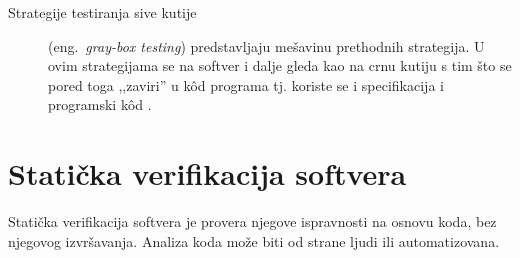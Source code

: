 \documentclass[12pt,oneside]{memoir}
\begin{document}
\begin{description}
\item [Strategije testiranja sive kutije] (eng.~\textit{gray-box testing}) predstavljaju mešavinu prethodnih strategija. U ovim strategijama se na softver i dalje gleda kao na crnu kutiju s tim što se pored toga ,,zaviri'' u  k\^od programa tj. koriste se i specifikacija i programski k\^od \cite{mvj, SoftTest}.
\end{description}



\section{Statička verifikacija softvera} \label{sec:staticka}

Statička verifikacija softvera je provera njegove ispravnosti na osnovu koda, bez njegovog izvršavanja. Analiza koda može biti od strane ljudi ili automatizovana. 

\end{document}
